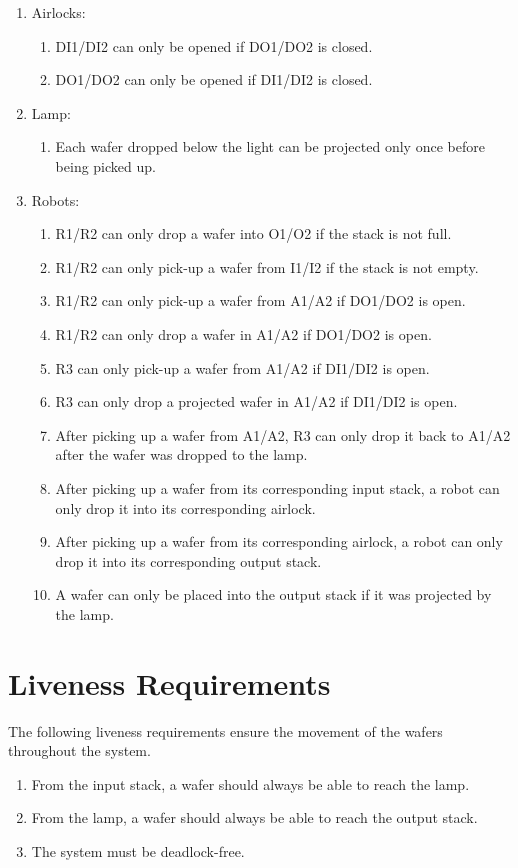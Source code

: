 \begin{enumerate}
\item Airlocks:
    \begin{enumerate}
    \item DI1/DI2 can only be opened if DO1/DO2 is closed.
    \item DO1/DO2 can only be opened if DI1/DI2 is closed.
    \end{enumerate}

\item Lamp:
    \begin{enumerate}
    \item Each wafer dropped below the light can be projected only once before being picked up.
    \end{enumerate}
    
\item Robots:
    \begin{enumerate}
    \item R1/R2 can only drop a wafer into O1/O2 if the stack is not full.
    \item R1/R2 can only pick-up a wafer from I1/I2 if the stack is not empty.
    \item R1/R2 can only pick-up a wafer from A1/A2 if DO1/DO2 is open.
    \item R1/R2 can only drop a wafer in A1/A2 if DO1/DO2 is open.
    \item R3 can only pick-up a wafer from A1/A2 if DI1/DI2 is open.
    \item R3 can only drop a projected wafer in A1/A2 if DI1/DI2 is open.
    \item After picking up a wafer from A1/A2, R3 can only drop it back to A1/A2 after the wafer was dropped to the lamp.
    \item After picking up a wafer from its corresponding input stack, a robot can only drop it into its corresponding airlock.
    \item After picking up a wafer from its corresponding airlock, a robot can only drop it into its corresponding output stack.
    \item A wafer can only be placed into the output stack if it was projected by the lamp.
    \end{enumerate}
\end{enumerate}

\section{Liveness Requirements}

The following liveness requirements ensure the movement of the wafers throughout the system.

\begin{enumerate}
    \item From the input stack, a wafer should always be able to reach the lamp.
    \item From the lamp, a wafer should always be able to reach the output stack.
    \item The system must be deadlock-free.
\end{enumerate}